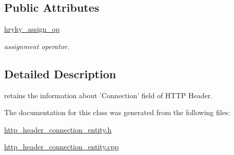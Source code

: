 \subsection*{Public Attributes}
\begin{DoxyCompactItemize}
\item 
\hypertarget{classhryky_1_1http_1_1header_1_1connection_1_1_entity_afe12258e9a31a71cd67487b11324bc21}{\hyperlink{classhryky_1_1http_1_1header_1_1connection_1_1_entity_afe12258e9a31a71cd67487b11324bc21}{hryky\-\_\-assign\-\_\-op}}\label{classhryky_1_1http_1_1header_1_1connection_1_1_entity_afe12258e9a31a71cd67487b11324bc21}

\begin{DoxyCompactList}\small\item\em assignment operator. \end{DoxyCompactList}\end{DoxyCompactItemize}


\subsection{Detailed Description}
retains the information about 'Connection' field of H\-T\-T\-P Header. 

The documentation for this class was generated from the following files\-:\begin{DoxyCompactItemize}
\item 
\hyperlink{http__header__connection__entity_8h}{http\-\_\-header\-\_\-connection\-\_\-entity.\-h}\item 
\hyperlink{http__header__connection__entity_8cpp}{http\-\_\-header\-\_\-connection\-\_\-entity.\-cpp}\end{DoxyCompactItemize}

